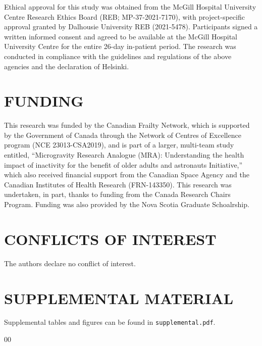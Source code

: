 \documentclass[preprint,12pt,authoryear]{elsarticle}
\begin{document}
    Ethical approval for this study was obtained from the McGill Hospital University Centre Research Ethics Board (REB; MP-37-2021-7170), with project-specific approval granted by Dalhousie University REB (2021-5478). Participants signed a written informed consent and agreed to be available at the McGill Hospital University Centre for the entire 26-day in-patient period. The research was conducted in compliance with the guidelines and regulations of the above agencies and the declaration of Helsinki. 

\section{FUNDING}

    This research was funded by the Canadian Frailty Network, which is supported by the Government of Canada through the Network of Centres of Excellence program (NCE 23013-CSA2019), and is part of a larger, multi-team study entitled, “Microgravity Research Analogue (MRA): Understanding the health impact of inactivity for the benefit of older adults and astronauts Initiative,” which also received financial support from the Canadian Space Agency and the Canadian Institutes of Health Research (FRN-143350). This research was undertaken, in part, thanks to funding from the Canada Research Chairs Program. Funding was also provided by the Nova Scotia Graduate Schoalrship.
    
\section{CONFLICTS OF INTEREST}

    The authors declare no conflict of interest.

\section{SUPPLEMENTAL MATERIAL}

    Supplemental tables and figures can be found in \texttt{supplemental.pdf}.

\begin{thebibliography}{00}

 


\end{thebibliography}
\end{document}
